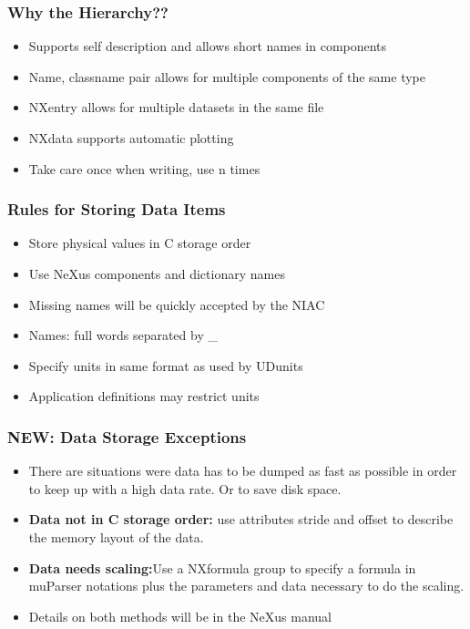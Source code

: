 \documentclass{beamer}
\begin{document}
\begin{frame} \frametitle{Why the Hierarchy??}
\begin{itemize}
\item<1->Supports self description and allows short names in components
\item<2->Name, classname pair allows for multiple components of the same type
\item<3->NXentry allows for multiple datasets in the same file
\item<4->NXdata supports automatic plotting
\item<5->Take care once when writing, use n times
\end{itemize}
\end{frame}

\begin{frame}
\frametitle{Rules for Storing Data Items}
\begin{itemize}
\item Store physical values in C storage order
\item Use NeXus components and dictionary names
\item Missing names will be quickly accepted by the NIAC
\item Names: full words separated by \_
\item Specify units in same format as used by UDunits
\item Application definitions may restrict units
\end{itemize}
\end{frame}

\begin{frame}
\frametitle{{\color{red} NEW: Data Storage Exceptions}}
\begin{itemize}
\item There are situations were data has to be dumped as fast as possible in order to 
 keep up with a high data rate. Or to save disk space.
\item {\bf Data not in C storage order:} use attributes stride and offset to describe the 
 memory layout of the data.
\item {\bf Data needs scaling:}Use a NXformula group to specify a formula in muParser 
 notations plus the parameters and data necessary to do the scaling.
\item Details on both methods will be in the NeXus manual  
\end{itemize}
\end{frame}
\end{document}
